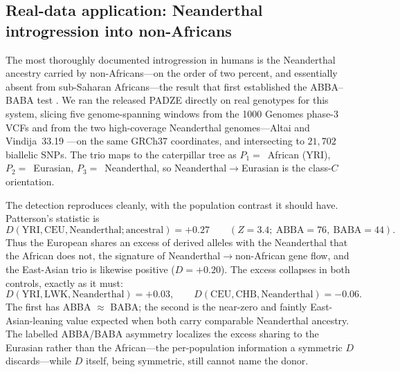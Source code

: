 \documentclass[11pt]{article}
\theoremstyle{plain}
\theoremstyle{definition}
\theoremstyle{remark}
\begin{document}
\subsection{Real-data application: Neanderthal introgression into non-Africans}
\label{subsec:neanderthal}

The most thoroughly documented introgression in humans is the Neanderthal ancestry carried by
non-Africans---on the order of two percent, and essentially absent from sub-Saharan Africans---the
result that first established the ABBA--BABA test \citep{green2010neandertal,prufer2014complete}. We
ran the released \textsc{PADZE} directly on real genotypes for this system, slicing five
genome-spanning windows from the 1000 Genomes phase-3 VCFs \citep{tgp2015global} and from the two
high-coverage Neanderthal genomes---Altai and Vindija~33.19
\citep{prufer2014complete,prufer2017vindija}---on the same GRCh37 coordinates, and intersecting to
$21{,}702$ biallelic SNPs. The trio maps to the caterpillar tree as $P_1=$~African (YRI),
$P_2=$~Eurasian, $P_3=$~Neanderthal, so Neanderthal$\to$Eurasian is the class-$C$ orientation.

The detection reproduces cleanly, with the population contrast it should have. Patterson's statistic is
\[
D(\text{YRI},\text{CEU},\text{Neanderthal};\text{ancestral})=+0.27
\qquad (Z=3.4;\ \mathrm{ABBA}=76,\ \mathrm{BABA}=44).
\]
Thus the European shares an excess of derived alleles with
the Neanderthal that the African does not, the signature of Neanderthal$\to$non-African gene flow,
and the East-Asian trio is likewise positive ($D=+0.20$). The excess collapses in both controls,
exactly as it must:
\[
D(\text{YRI},\text{LWK},\text{Neanderthal})=+0.03,
\qquad
D(\text{CEU},\text{CHB},\text{Neanderthal})=-0.06.
\]
The first has ABBA $\approx$ BABA; the second is the near-zero and faintly
East-Asian-leaning value expected when both carry comparable Neanderthal ancestry. The labelled
ABBA/BABA asymmetry localizes the excess sharing to the Eurasian rather than the African---the
per-population information a symmetric $D$ discards---while $D$ itself, being symmetric, still cannot
name the donor.
\end{document}
